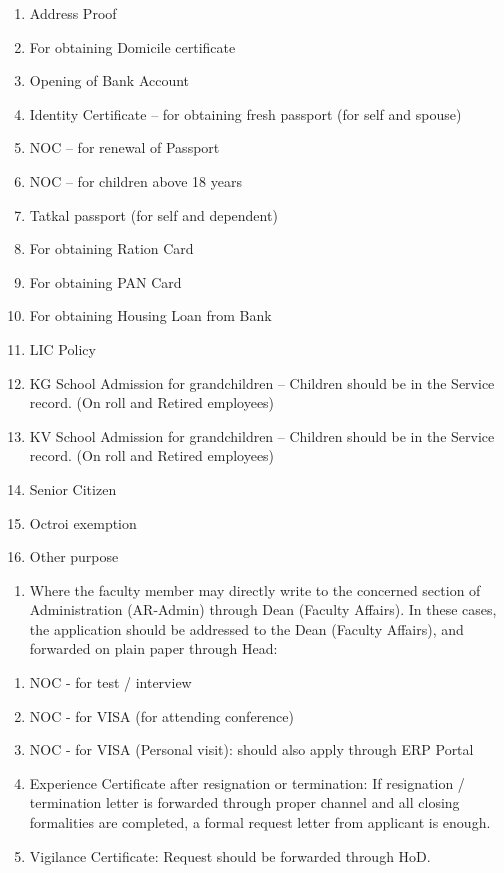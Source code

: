 \documentclass[
  10pt,
  a5paper,
  10pt,
  openany]{amsbook}
\providecommand{\tightlist}{%
  \setlength{\itemsep}{0pt}\setlength{\parskip}{0pt}}
\begin{document}
\begin{enumerate}
\def\labelenumi{\arabic{enumi}.}
\tightlist
\item
  Address Proof
\item
  For obtaining Domicile certificate
\item
  Opening of Bank Account
\item
  Identity Certificate -- for obtaining fresh passport (for self and
  spouse)
\item
  NOC -- for renewal of Passport
\item
  NOC -- for children above 18 years
\item
  Tatkal passport (for self and dependent)
\item
  For obtaining Ration Card
\item
  For obtaining PAN Card
\item
  For obtaining Housing Loan from Bank
\item
  LIC Policy
\item
  KG School Admission for grandchildren -- Children should be in the
  Service record. (On roll and Retired employees)
\item
  KV School Admission for grandchildren -- Children should be in the
  Service record. (On roll and Retired employees)
\item
  Senior Citizen
\item
  Octroi exemption
\item
  Other purpose
\end{enumerate}

\begin{enumerate}
\def\labelenumi{\alph{enumi}.}
\setcounter{enumi}{1}
\tightlist
\item
  Where the faculty member may directly write to the concerned section
  of Administration (AR-Admin) through Dean (Faculty Affairs). In these
  cases, the application should be addressed to the Dean (Faculty
  Affairs), and forwarded on plain paper through Head:
\end{enumerate}

\begin{enumerate}
\def\labelenumi{\arabic{enumi}.}
\tightlist
\item
  NOC - for test / interview
\item
  NOC - for VISA (for attending conference)
\item
  NOC - for VISA (Personal visit): should also apply through ERP Portal
\item
  Experience Certificate after resignation or termination: If
  resignation / termination letter is forwarded through proper channel
  and all closing formalities are completed, a formal request letter
  from applicant is enough.
\item
  Vigilance Certificate: Request should be forwarded through HoD.
\end{enumerate}
\end{document}
